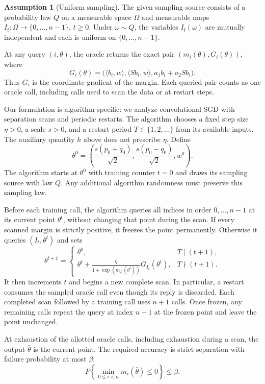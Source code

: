\documentclass[10pt]{article}
\theoremstyle{definition}
\newtheorem{assumption}{Assumption}
\begin{document}
\begin{assumption}[Uniform sampling]
The given sampling source consists of a probability law $Q$ on a measurable space $\Omega$ and measurable maps $I_t:\Omega\to\{0,\ldots,n-1\}$, $t\geq0$. Under $\omega\sim Q$, the variables $I_t(\omega)$ are mutually independent and each is uniform on $\{0,\ldots,n-1\}$.
\end{assumption}

At any query $(i,\theta)$, the oracle returns the exact pair $(m_i(\theta),G_i(\theta))$, where
\[
G_i(\theta)=
\bigl(\langle b_i,w\rangle,\langle Sb_i,w\rangle,
      a_1b_i+a_2Sb_i\bigr).
\]
Thus $G_i$ is the coordinate gradient of the margin. Each queried pair counts as one oracle call, including calls used to scan the data or at restart steps.

Our formulation is algorithm-specific: we analyze convolutional SGD with separation scans and periodic restarts. The algorithm chooses a fixed step size $\eta>0$, a scale $s>0$, and a restart period $T\in\{1,2,\ldots\}$ from its available inputs. The auxiliary quantity $h$ above does not prescribe $\eta$. Define
\[
\theta^0=
\left(\frac{s(p_0+q_0)}{\sqrt{2}},
      \frac{s(p_0-q_0)}{\sqrt{2}},w^0\right).
\]
The algorithm starts at $\theta^0$ with training counter $t=0$ and draws its sampling source with law $Q$. Any additional algorithm randomness must preserve this sampling law.

Before each training call, the algorithm queries all indices in order $0,\ldots,n-1$ at its current point $\theta^t$, without changing that point during the scan. If every scanned margin is strictly positive, it freezes the point permanently. Otherwise it queries $(I_t,\theta^t)$ and sets
\[
\theta^{t+1}=
\begin{cases}
\theta^0,& T\mid(t+1),\\
\displaystyle\theta^t+
\frac{\eta}{1+\exp(m_{I_t}(\theta^t))}
G_{I_t}(\theta^t),&T\nmid(t+1).
\end{cases}
\]
It then increments $t$ and begins a new complete scan. In particular, a restart consumes the sampled oracle call even though its reply is discarded. Each completed scan followed by a training call uses $n+1$ calls. Once frozen, any remaining calls repeat the query at index $n-1$ at the frozen point and leave the point unchanged.

At exhaustion of the allotted oracle calls, including exhaustion during a scan, the output $\bar\theta$ is the current point. The required accuracy is strict separation with failure probability at most $\beta$:
\[
P\left\{\min_{0\leq i<n}m_i(\bar\theta)\leq0\right\}
\leq\beta.
\]
\end{document}
